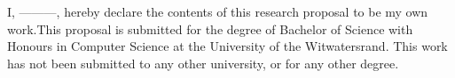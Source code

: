 \begin{ethics}
I, ---------, hereby declare the contents of this research proposal to be my own work.This proposal is submitted for the degree of Bachelor of Science with Honours in Computer Science at the University of the Witwatersrand.
This work has not been submitted to any other university, or for any other degree.
\end{ethics}